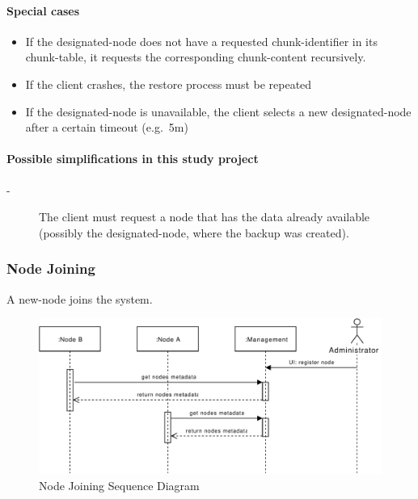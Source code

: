 \paragraph{Special cases}
\begin{itemize}
    \item If the \gls{designated-node} does not have a requested \gls{chunk-identifier} in its \gls{chunk-table}, it requests the corresponding \gls{chunk-content} recursively.
    \item If the \gls{client} crashes, the restore process must be repeated
    \item If the \gls{designated-node} is unavailable, the \gls{client} selects a new \gls{designated-node} after a certain timeout (e.g.\ 5m)
\end{itemize}

\paragraph{Possible simplifications in this study project}
\begin{description}
    \item[-] The \gls{client} must request a \gls{node} that has the data already available (possibly the \gls{designated-node}, where the backup was created).
\end{description}


\subsubsection{Node Joining}\label{sec:scenario-node-join}
A \gls{new-node} joins the system.

\begin{figure}[h]
    \centering
    \includegraphics[width=\linewidth]{resources/node_joining.pdf}
    \caption{Node Joining Sequence Diagram}
    \label{fig:node-joining}
\end{figure}

